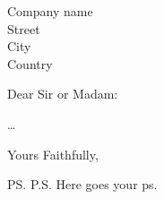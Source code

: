 \documentclass{letter}
\begin{document}
\begin{letter}{Company name \\ Street\\ City\\ Country}

\opening{Dear Sir or Madam:}
\dots
\closing{Yours Faithfully,}
\ps{P.S. Here goes your ps.}

\end{letter}
\end{document}

